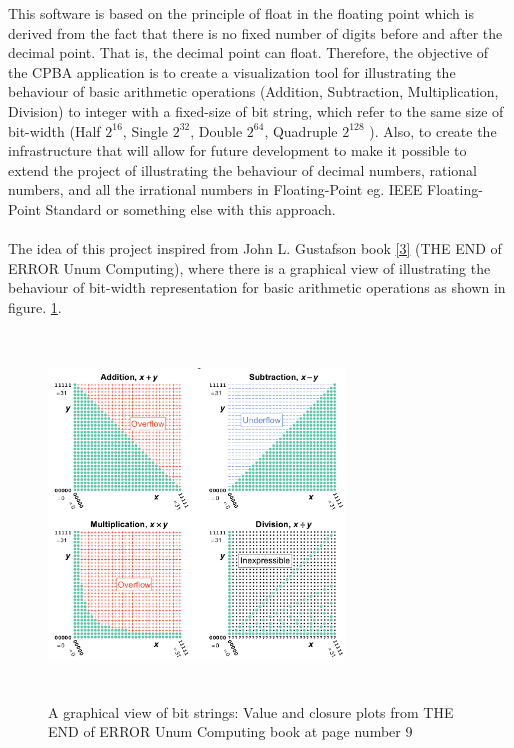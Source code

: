 \documentclass[11pt]{article}
\begin{document}
This software is based on the principle of float in the floating point which is derived from the fact that there is no fixed number of digits before and after the decimal point. That is, the decimal point can float. Therefore, the objective of the CPBA application is to create a visualization tool for illustrating the behaviour of basic arithmetic operations (Addition, Subtraction, Multiplication, Division) to integer with a fixed-size of bit string, which refer to the same size of bit-width (Half $2^{16}$, Single $2^{32}$, Double $2^{64}$, Quadruple $2^{128}$ ). Also, to create the infrastructure that will allow for future development to make it possible to extend the project of illustrating the behaviour of decimal numbers, rational numbers, and all the irrational numbers in Floating-Point eg. IEEE Floating-Point Standard or something else with this approach.\\
\\The idea of this project inspired from John L. Gustafson book \ref{3} (THE END of ERROR Unum Computing), where there is a graphical view of illustrating the behaviour of bit-width representation for basic arithmetic operations as shown in figure. \ref{book}.\\
\begin{figure}[h]
    \centering
    \includegraphics[height=9.7cm,width=0.7\textwidth]{book}
    \caption{A graphical view of bit strings: Value and closure plots from THE END of ERROR Unum Computing book at page number 9}
    \label{book}
\end{figure}
\newpage
\end{document}
